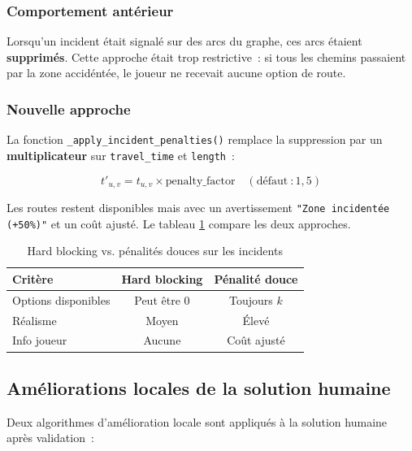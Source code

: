 \documentclass[a4paper, 12pt, twoside]{article}
\begin{document}
\subsubsection{Comportement ant\'{e}rieur}

Lorsqu'un incident \'{e}tait signal\'{e} sur des arcs du graphe, ces arcs \'{e}taient \textbf{supprim\'{e}s}. Cette approche \'{e}tait trop restrictive~: si tous les chemins passaient par la zone accid\'{e}nt\'{e}e, le joueur ne recevait aucune option de route.

\subsubsection{Nouvelle approche}

La fonction \texttt{\_apply\_incident\_penalties()} remplace la suppression par un \textbf{multiplicateur} sur \texttt{travel\_time} et \texttt{length}~:

\[
t'_{u,v} = t_{u,v} \times \text{penalty\_factor} \quad (\text{d\'{e}faut}~: 1{,}5)
\]

Les routes restent disponibles mais avec un avertissement \texttt{"Zone incident\'{e}e (+50\%)"} et un co\^{u}t ajust\'{e}. Le tableau \ref{tab:incidents} compare les deux approches.

\begin{table}[h]
\begin{center}
\begin{tabular}{|l|c|c|}
\hline
\textbf{Crit\`{e}re} & \textbf{Hard blocking} & \textbf{P\'{e}nalit\'{e} douce} \\
\hline
Options disponibles & Peut \^{e}tre 0 & Toujours $k$ \\
\hline
R\'{e}alisme & Moyen & \'{E}lev\'{e} \\
\hline
Info joueur & Aucune & Co\^{u}t ajust\'{e} \\
\hline
\end{tabular}
\end{center}
\caption{Hard blocking vs. p\'{e}nalit\'{e}s douces sur les incidents}
\label{tab:incidents}
\end{table}

\subsection{Am\'{e}liorations locales de la solution humaine}

Deux algorithmes d'am\'{e}lioration locale sont appliqu\'{e}s \`{a} la solution humaine apr\`{e}s validation~:
\end{document}
